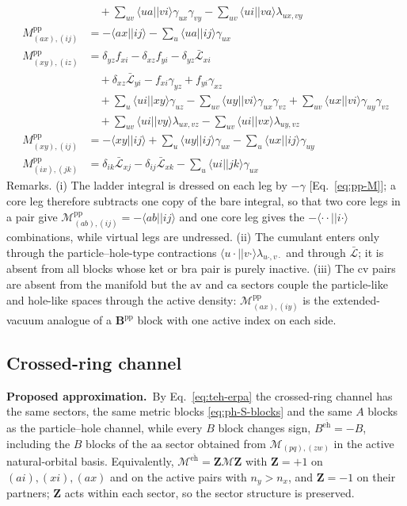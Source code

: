 \documentclass[aip,jcp,reprint,noshowkeys,superscriptaddress]{revtex4-1}
\newcommand{\bB}{\boldsymbol{B}}
\newcommand{\bZ}{\boldsymbol{Z}}
\newcommand{\bcalM}{\boldsymbol{\mathcal M}}
\newcommand{\teh}{\overline{\text{eh}}}
\newcommand{\pp}{\text{pp}}
\newcommand{\sLag}{\bar{\mathcal L}}
\newcommand{\scv}{\text{cv}}
\newcommand{\sca}{\text{ca}}
\newcommand{\sav}{\text{av}}
\newcommand{\saa}{\text{aa}}
\newcommand{\Proposed}{\textbf{Proposed approximation.}\ }
\begin{document}
\begin{align}
  &\quad +\sum_{uv}\langle ua||vi\rangle\gamma_{ux}\gamma_{vy} -\sum_{uv}\langle ui||va\rangle\lambda_{ux,vy}
  \label{eq:pp-av-ca}\\
  M^{\pp}_{(ax),(ij)} &= -\langle ax||ij\rangle -\sum_{u}\langle ua||ij\rangle\gamma_{ux}
  \label{eq:pp-av-cc}\\
  M^{\pp}_{(xy),(iz)} &= \delta_{yz}f_{xi} -\delta_{xz}f_{yi} -\delta_{yz}\bar{\mathcal L}_{xi} \nonumber\\
  &\quad +\delta_{xz}\bar{\mathcal L}_{yi} -f_{xi}\gamma_{yz} +f_{yi}\gamma_{xz} \nonumber\\
  &\quad +\sum_{u}\langle ui||xy\rangle\gamma_{uz} -\sum_{uv}\langle uy||vi\rangle\gamma_{ux}\gamma_{vz} +\sum_{uv}\langle ux||vi\rangle\gamma_{uy}\gamma_{vz} \nonumber\\
  &\quad +\sum_{uv}\langle ui||vy\rangle\lambda_{ux,vz} -\sum_{uv}\langle ui||vx\rangle\lambda_{uy,vz}
  \label{eq:pp-aa-ca}\\
  M^{\pp}_{(xy),(ij)} &= -\langle xy||ij\rangle +\sum_{u}\langle uy||ij\rangle\gamma_{ux} -\sum_{u}\langle ux||ij\rangle\gamma_{uy}
  \label{eq:pp-aa-cc}\\
  M^{\pp}_{(ix),(jk)} &= \delta_{ik}\bar{\mathcal L}_{xj} -\delta_{ij}\bar{\mathcal L}_{xk} -\sum_{u}\langle ui||jk\rangle\gamma_{ux}
  \label{eq:pp-ca-cc}
\end{align}
Remarks.  (i) The ladder integral is dressed on each leg by $-\gamma$
[Eq.~\eqref{eq:pp-M}]; a core leg therefore subtracts one copy of the bare
integral, so that two core legs in a pair give
$\mathcal M^{\pp}_{(ab),(ij)}=-\langle ab||ij\rangle$ and one core leg gives the
$-\langle\cdot\cdot||i\cdot\rangle$ combinations, while virtual legs are
undressed.  (ii) The cumulant enters
only through the particle--hole-type contractions
$\langle u\cdot||v\cdot\rangle\lambda_{u\cdot,v\cdot}$ and through $\sLag$; it is
absent from all blocks whose ket or bra pair is purely inactive.  (iii)
The $\scv$ pairs are absent from the manifold but the $\sav$ and $\sca$
sectors couple the particle-like and hole-like spaces through the active
density: $\mathcal M^{\pp}_{(ax),(iy)}$ is the extended-vacuum analogue of a
$\bB^{\pp}$ block with one active index on each side.
\twocolumngrid

\subsection{Crossed-ring channel}
\label{sec:teh-blocks}

\Proposed By Eq.~\eqref{eq:teh-erpa} the crossed-ring channel has the same
sectors, the same metric blocks \eqref{eq:ph-S-blocks} and the same $A$ blocks
as the particle--hole channel, while every $B$ block changes sign,
$B^{\teh}=-B$, including the $B$ blocks of the $\saa$ sector obtained from
$\mathcal M_{(pq),(zw)}$ in the active natural-orbital basis.  Equivalently,
$\bcalM^{\teh}=\bZ\bcalM\bZ$ with $\bZ=+1$ on $(ai),(xi),(ax)$ and on the
active pairs with $n_y>n_x$, and $\bZ=-1$ on their partners; $\bZ$ acts within
each sector, so the sector structure is preserved.
\end{document}
